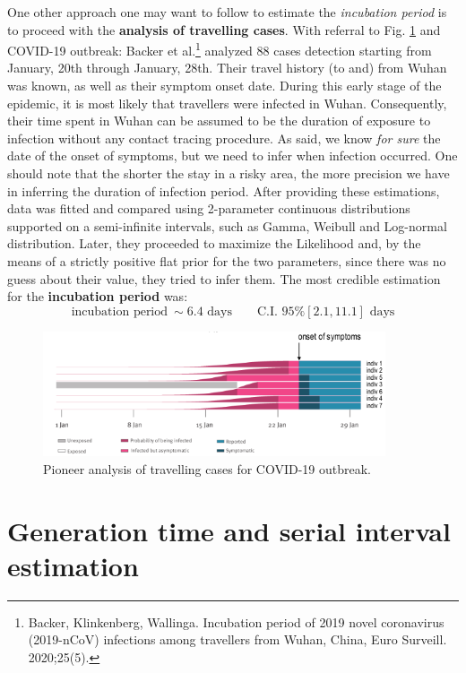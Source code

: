 \documentclass[../main/main.tex]{subfiles}
\begin{document}
One other approach one may want to follow to estimate the \textit{incubation period} is to proceed with the \textbf{analysis of travelling cases}. With referral to Fig. \ref{fig:22_03} and COVID-19 outbreak: Backer et al.\footnote{Backer, Klinkenberg, Wallinga. Incubation period of 2019 novel coronavirus (2019-nCoV) infections among travellers from Wuhan, China, Euro Surveill. 2020;25(5).} analyzed 88 cases detection starting from January, 20th through January, 28th. Their travel history (to and) from Wuhan was known, as well as their symptom onset date. During this early stage of the epidemic, it is most likely that travellers were infected in Wuhan. Consequently, their time spent in Wuhan can be assumed to be the duration of exposure to infection without any contact tracing procedure.
As said, we know \textit{for sure} the date of the onset of symptoms, but we need to infer when infection occurred. One should note that the shorter the stay in a risky area, the more precision we have in inferring the duration of infection period. After providing these estimations, data was fitted and compared using 2-parameter continuous distributions supported on a semi-infinite intervals, such as Gamma, Weibull and Log-normal distribution. Later, they proceeded to maximize the Likelihood and, by the means of a strictly positive flat prior for the two parameters, since there was no guess about their value, they tried to infer them. The most credible estimation for the \textbf{incubation period} was:
\begin{equation}
    \text{incubation period} \ \sim 6.4 \text{ days} \qquad \text{C.I. 95\%}[2.1, 11.1]\text{ days}
\end{equation}

\begin{figure}[h!]
\centering
\includegraphics[width=0.90\textwidth]{../lessons/image/22/image03.png}
\caption{\label{fig:22_03} Pioneer analysis of travelling cases for COVID-19 outbreak.}
\end{figure}




\section{Generation time and serial interval estimation}
\end{document}
